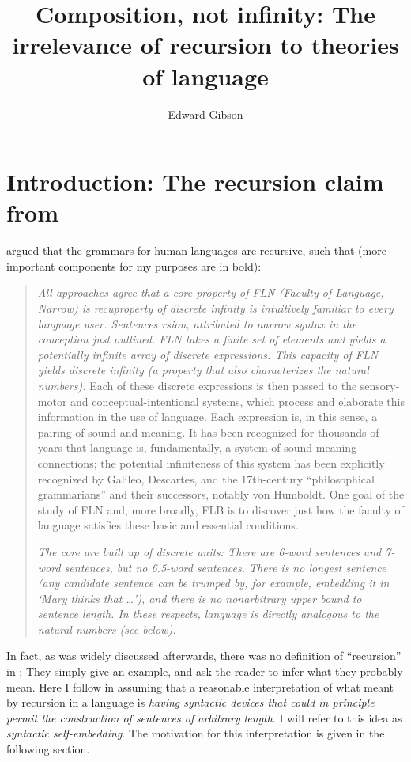 \documentclass{article}
\title[Composition, not infinity]{Composition, not infinity: The irrelevance of recursion to theories of language}
\author{Edward Gibson\affiliation{Department of Brain and Cognitive Sciences, MIT}}
\begin{document}
\maketitle


\section{Introduction: The recursion claim from \citet{hauser2002faculty}}

\citet{hauser2002faculty} argued that the grammars for human languages are recursive, such that (more important components for my purposes are in bold):

\begin{quote}
\emph{All approaches agree that a core property of FLN (Faculty of Language, Narrow) is recuproperty of discrete infinity is intuitively familiar to every language user. Sentences rsion, attributed to narrow syntax in the conception just outlined. FLN takes a finite set of elements and yields a potentially infinite array of discrete expressions. This capacity of FLN yields discrete infinity (a property that also characterizes the natural numbers).} Each of these discrete expressions is then passed to the sensory-motor and conceptual-intentional systems, which process and elaborate this information in the use of language. Each expression is, in this sense, a pairing of sound and meaning. It has been recognized for thousands of years that language is, fundamentally, a system of sound-meaning connections; the potential infiniteness of this system has been explicitly recognized by Galileo, Descartes, and the 17th-century ``philosophical grammarians'' and their successors, notably von Humboldt. One goal of the study of FLN and, more broadly, FLB is to discover just how the faculty of language satisfies these basic and essential conditions.

\emph{The core are built up of discrete units:  There are 6-word sentences and 7-word sentences, but no 6.5-word sentences.  There is no longest sentence (any candidate sentence can be trumped by, for example, embedding it in `Mary thinks that  \ldots '), and there is no nonarbitrary upper bound to sentence length.  In these respects, language is directly analogous to the natural numbers (see below). } \citep[1571]{hauser2002faculty}
\end{quote}

In fact, as was widely discussed afterwards, there was no definition of ``recursion'' in \citet{hauser2002faculty};  They simply give an example, and ask the reader to infer what they probably mean.  
Here I follow \citet{pullum2020theorizing}  in assuming that a reasonable interpretation of what  \citet{hauser2002faculty} meant by recursion in a language is \textit{having syntactic devices that could in principle permit the construction of sentences of arbitrary length}.  I will refer to  this idea as \emph{syntactic self-embedding}.  The motivation for this interpretation is given in the following section.
\end{document}
